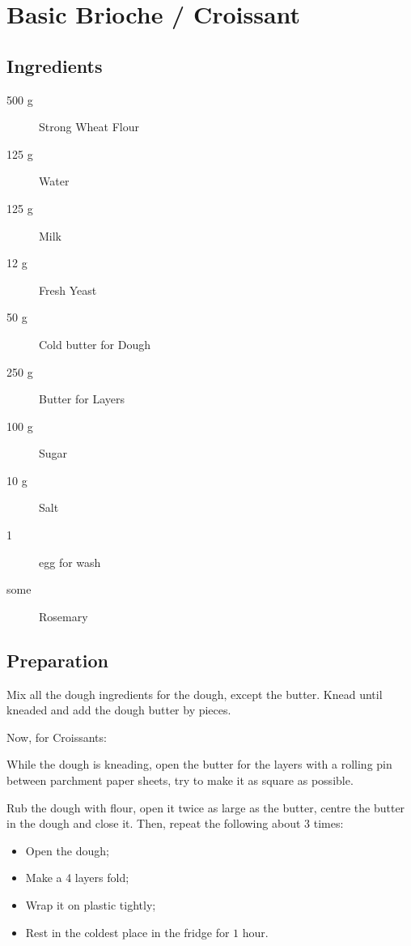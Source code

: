 \setchapterpreamble[u]{\margintoc}
\chapter{Basic Brioche / Croissant}\label{burger buns}

\section{Ingredients}

\begin{multicols}{2}
	\begin{description}
		\item[500 g] Strong Wheat Flour
		\item[125 g] Water
		\item[125 g] Milk
		\item[12 g] Fresh Yeast
		\item[50 g] Cold butter for Dough
		\item[250 g] Butter for Layers
		\item[100 g] Sugar
		\item[10 g] Salt
		\item[1] egg for wash
		\item[some] Rosemary
	\end{description}
\end{multicols}	

\section{Preparation}
Mix all the dough ingredients for the dough, except the butter. Knead until kneaded and add the dough butter by pieces.

Now, for Croissants:

While the dough is kneading, open the butter for the layers with a rolling pin between parchment paper sheets, try to make it as square as possible.

Rub the dough with flour, open it twice as large as the butter, centre the butter in the dough and close it. Then, repeat the following about $3$ times:

\begin{itemize}
	\item Open the dough; 
	\item Make a 4 layers fold;
	\item Wrap it on plastic tightly;
	\item Rest in the coldest place in the fridge for $1$ hour.
\end{itemize}

